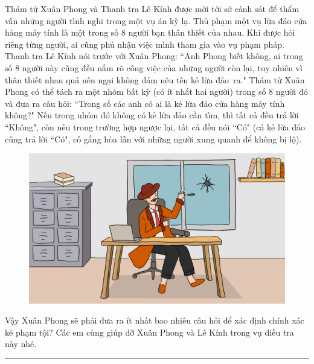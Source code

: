 \begin{multicols}{2}
	Thám tử Xuân Phong và Thanh tra Lê Kính được mời tới sở cảnh sát để thẩm vấn những người tình nghi trong một vụ án kỳ lạ. Thủ phạm một vụ lừa đảo cửa hàng máy tính là một trong số $8$ người bạn thân thiết của nhau. Khi được hỏi riêng từng người, ai cũng phủ nhận việc mình tham gia vào vụ phạm pháp. Thanh tra Lê Kính nói trước với Xuân Phong: ``Anh Phong biết không, ai trong số $8$ người này cũng đều nắm rõ công việc của những người còn lại, tuy nhiên vì thân thiết nhau quá nên ngại không dám nêu tên kẻ lừa đảo~ra."
	\vskip 0.1cm
	Thám tử Xuân Phong có thể tách ra một nhóm bất kỳ (có  ít nhất hai người) trong số $8$ người đó và đưa ra câu hỏi: ``Trong số các anh có ai là kẻ lừa đảo cửa hàng máy tính không?" Nếu trong nhóm đó không có kẻ lừa đảo cần tìm, thì tất cả đều trả lời ``Không", còn nếu trong trường hợp ngược lại, tất cả đều nói ``Có" (cả kẻ lừa đảo cũng trả lời ``Có", cố gắng hòa lẫn với những người xung quanh để không bị lộ).
	\begin{figure}[H]
		\vspace*{-5pt}
		\centering
		\captionsetup{labelformat= empty, justification=centering}
		\includegraphics[width= 1\linewidth]{xp}
		\vspace*{-15pt}
	\end{figure}
	Vậy Xuân Phong sẽ phải đưa ra ít nhất bao nhiêu câu hỏi để xác định chính xác kẻ phạm tội? Các em cùng giúp đỡ Xuân Phong và Lê Kính trong vụ điều tra này nhé.
\end{multicols}
\vspace*{-10pt}
\rule{1\linewidth}{0.1pt}
\begingroup
